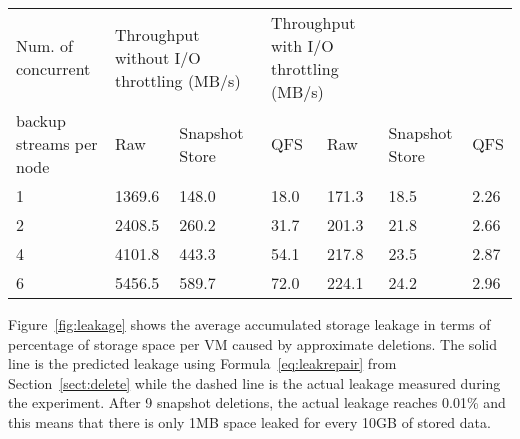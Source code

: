 \begin{table}
    \begin{tabular}{l|lll|lll}
    Num. of concurrent      & \multicolumn{2}{l}{Throughput without I/O throttling (MB/s)} & \multicolumn{2}{l}{Throughput with I/O throttling (MB/s)} \\
    backup streams per node & Raw                                       & Snapshot Store & QFS  & Raw                                    & Snapshot Store & QFS  \\
    1                       & 1369.6                                    & 148.0          & 18.0 & 171.3                                  & 18.5           & 2.26 \\
    2                       & 2408.5                                    & 260.2          & 31.7 & 201.3                                  & 21.8           & 2.66 \\
    4                       & 4101.8                                    & 443.3          & 54.1 & 217.8                                  & 23.5           & 2.87 \\
    6                       & 5456.5                                    & 589.7          & 72.0 & 224.1                                  & 24.2           & 2.96 \\
    \end{tabular}
\end{table}



Figure~\ref{fig:leakage} shows the average accumulated storage leakage in terms of percentage of
storage space per VM caused  by approximate deletions.
The solid line is the predicted leakage using Formula~\ref{eq:leakrepair} from Section~\ref{sect:delete}
while the dashed line is the actual leakage measured during the experiment.
After 9 snapshot deletions, the actual leakage reaches 0.01\% and this means that
there is only 1MB space leaked for every 10GB of stored data. 
